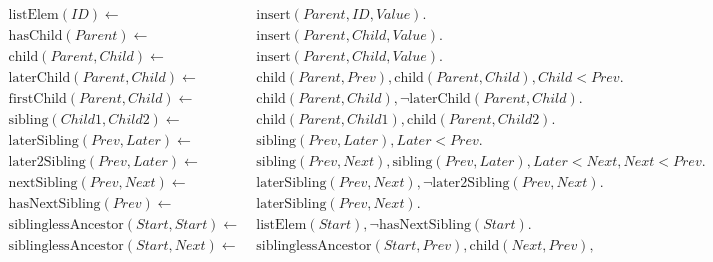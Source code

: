 \documentclass[twocolumn,10pt]{article}
\begin{document}
\begin{figure*}
\begin{align*}
    \mathrm{listElem}(\mathit{ID}) \leftarrow\; &
    \mathrm{insert}(\mathit{Parent}, \mathit{ID}, \mathit{Value}).
\\
    \mathrm{hasChild}(\mathit{Parent}) \leftarrow\; &
    \mathrm{insert}(\mathit{Parent}, \mathit{Child}, \mathit{Value}).
\\
    \mathrm{child}(\mathit{Parent}, \mathit{Child}) \leftarrow\; &
    \mathrm{insert}(\mathit{Parent}, \mathit{Child}, \mathit{Value}).
\\
    \mathrm{laterChild}(\mathit{Parent}, \mathit{Child}) \leftarrow\; &
    \mathrm{child}(\mathit{Parent}, \mathit{Prev}),
    \mathrm{child}(\mathit{Parent}, \mathit{Child}),
    \mathit{Child} < \mathit{Prev}.
\\
    \mathrm{firstChild}(\mathit{Parent}, \mathit{Child}) \leftarrow\; &
    \mathrm{child}(\mathit{Parent}, \mathit{Child}),
    \neg\mathrm{laterChild}(\mathit{Parent}, \mathit{Child}).
\\
    \mathrm{sibling}(\mathit{Child1}, \mathit{Child2}) \leftarrow\; &
    \mathrm{child}(\mathit{Parent}, \mathit{Child1}),
    \mathrm{child}(\mathit{Parent}, \mathit{Child2}).
\\
    \mathrm{laterSibling}(\mathit{Prev}, \mathit{Later}) \leftarrow\; &
    \mathrm{sibling}(\mathit{Prev}, \mathit{Later}),
    \mathit{Later} < \mathit{Prev}.
\\
    \mathrm{later2Sibling}(\mathit{Prev}, \mathit{Later}) \leftarrow\; &
    \mathrm{sibling}(\mathit{Prev}, \mathit{Next}),
    \mathrm{sibling}(\mathit{Prev}, \mathit{Later}),
    \mathit{Later} < \mathit{Next},
    \mathit{Next} < \mathit{Prev}.
\\
    \mathrm{nextSibling}(\mathit{Prev}, \mathit{Next}) \leftarrow\; &
    \mathrm{laterSibling}(\mathit{Prev}, \mathit{Next}),
    \neg\mathrm{later2Sibling}(\mathit{Prev}, \mathit{Next}).
\\
    \mathrm{hasNextSibling}(\mathit{Prev}) \leftarrow\; &
    \mathrm{laterSibling}(\mathit{Prev}, \mathit{Next}).
\\
    \mathrm{siblinglessAncestor}(\mathit{Start}, \mathit{Start}) \leftarrow\; &
    \mathrm{listElem}(\mathit{Start}),
    \neg\mathrm{hasNextSibling}(\mathit{Start}).
\\
    \mathrm{siblinglessAncestor}(\mathit{Start}, \mathit{Next}) \leftarrow\; &
    \mathrm{siblinglessAncestor}(\mathit{Start}, \mathit{Prev}),
    \mathrm{child}(\mathit{Next}, \mathit{Prev}),

\end{align*}
\end{figure*}
\end{document}
